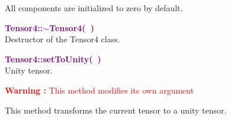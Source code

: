 All components are initialized to zero by default.

\textcolor{purple}{\textbf{Tensor4::$\sim$Tensor4(~)}}\label{Tensor4::~Tensor4()}\\
Destructor of the Tensor4 class.


\textcolor{purple}{\textbf{Tensor4::setToUnity(~)}}\label{Tensor4::setToUnity()}\\
Unity tensor.

\hspace*{10mm}\textcolor{red}{\textbf{Warning :} This method modifies its own argument}

This method transforms the current tensor to a unity tensor.
